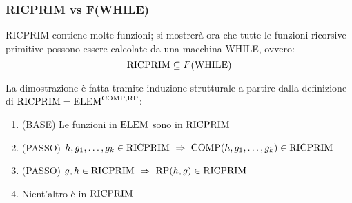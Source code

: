 \subsubsection*{RICPRIM vs F(WHILE)}

RICPRIM contiene molte funzioni; si mostrerà ora che tutte le funzioni ricorsive primitive
possono essere calcolate da una macchina WHILE, ovvero:
$$ \text{RICPRIM} \subseteq F(\text{WHILE}) $$

La dimostrazione è fatta tramite induzione strutturale a partire dalla definizione di
$\text{RICPRIM}=\text{ELEM}^{\text{COMP},\text{RP}}$:
\begin{enumerate}
    \item (BASE) Le funzioni in $\text{ELEM}$ sono in $\text{RICPRIM}$
    \item (PASSO) $h,g_1,\dots,g_k\in\ricPrim \ \Rightarrow \ \comp(h,g_1,\dots,g_k)\in\ricPrim$
    \item (PASSO) $g,h\in\ricPrim \ \Rightarrow \ \RP(h,g)\in\ricPrim$
    \item Nient'altro è in $\text{RICPRIM}$
\end{enumerate}\label{sec:ricprim_while}
\vspace{1em}

